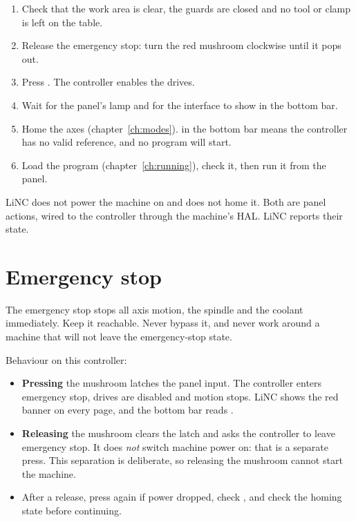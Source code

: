 \begin{enumerate}
  \item Check that the work area is clear, the guards are closed and no tool or clamp is
        left on the table.
  \item Release the emergency stop: turn the red mushroom clockwise until it pops out.
  \item Press . The controller enables the drives.
  \item Wait for the panel's   lamp and for the interface
        to show  in the bottom bar.
  \item Home the axes (chapter~\ref{ch:modes}).  in the bottom bar means
        the controller has no valid reference, and no program will start.
  \item Load the program (chapter~\ref{ch:running}), check it, then run it from the panel.
\end{enumerate}

\begin{notebox}
  LiNC does not power the machine on and does not home it. Both are panel actions, wired
  to the controller through the machine's HAL. LiNC reports their state.
\end{notebox}

\section{Emergency stop}
\label{sec:estop}

\begin{safetybox}
  The emergency stop stops all axis motion, the spindle and the coolant immediately.
  Keep it reachable. Never bypass it, and never work around a machine that will not
  leave the emergency-stop state.
\end{safetybox}

Behaviour on this controller:

\begin{itemize}
  \item \textbf{Pressing} the mushroom latches the panel input. The controller enters
        emergency stop, drives are disabled and motion stops. LiNC shows the red banner
         on every page,
        and the bottom bar reads .
  \item \textbf{Releasing} the mushroom clears the latch and asks the controller to leave
        emergency stop. It does \emph{not} switch machine power on: that is a separate
         press. This separation is deliberate, so releasing the mushroom cannot
        start the machine.
  \item After a release, press  again if power dropped, check , and
        check the homing state before continuing.
\end{itemize}

